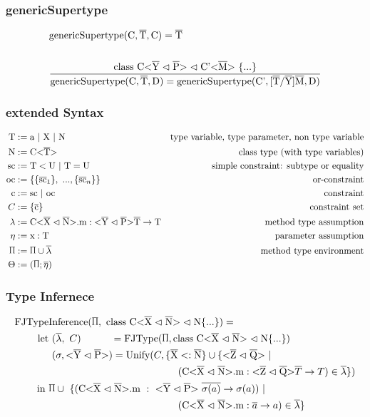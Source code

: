 \documentclass[aspectratio=169]{beamer}
\begin{document}
\begin{frame}[fragile]
    \frametitle{genericSupertype}
    \begin{align*}
        &\text{genericSupertype} (\text{C}, \overline{\text{T}}, \text{C} ) = \overline{\text{T}}\\
        \\
        &\frac{ \text{class} \ \text{C} \text{<} \overline{\text{Y}} \vartriangleleft \overline{\text{P}} \text{>} \vartriangleleft \text{C'<}\overline{\text{M}}\text{>} \ \{ ... \} }{ \text{genericSupertype} ( \text{C}, \overline{\text{T}}, \text{D} ) = \text{genericSupertype} ( \text{C'}, \text{[}\overline{\text{T}}/\overline{\text{Y}}\text{]}\overline{\text{M}}, \text{D} ) }\\
    \end{align*}
\end{frame}

\begin{frame}[fragile]
    \frametitle{extended Syntax}
    \begin{align*}
        \text{T} &:= \text{a} \ | \ \text{X} \ | \ \text{N} &\text{type variable, type parameter, non type variable} \\
        \text{N} &:= \text{C} \vv{\ot{T}} &\text{class type (with type variables)}\\
        \text{sc} &:= \text{T} < \text{U} \ | \ \text{T} = \text{U} &\text{simple constraint: subtype or equality}\\
        \text{oc} &:= \{ \{ \ot{sc}_1 \}, \ ..., \{ \ot{sc}_n \} \} &\text{or-constraint}\\
        \text{c} &:= \text{sc} \ | \ \text{oc} &\text{constraint}\\
        C &:= \{ \ot{c} \} &\text{constraint set}\\
        \lambda &:= \cm : \yp \oto{\text{T}} &\text{method type assumption}\\
        \eta &:= \text{x} : \text{T} &\text{parameter assumption}\\
        \sprod{0.7} &:= \sprod{0.7} \cup \overline{\lambda} &\text{method type environment}\\
        \Theta &:= ( \sprod{0.7}; \overline{\eta} )
    \end{align*}
\end{frame}

\begin{frame}[fragile]
    \frametitle{Type Infernece}
    \begin{align*}
        \text{FJType}&\text{Inference}(\sprod{0.7}, \ \classheader \{ ... \}) = \\
        \text{let} & \ (\overline{\lambda}, \ C) \quad \quad \quad = \text{FJType}(\sprod{0.7}, \classheader \{ ... \}) \\
        & \ (\sigma, \yp) = \text{Unify}(C, \{ \overline{\text{X}} <: \overline{\text{N}} \} \cup \{ \zq \ | \\
        & \quad \quad \quad \quad \quad \quad \quad \quad \quad \quad \quad \quad \quad (\cm : \zq \oto{T} ) \in \overline{\lambda} \} ) \\
        \text{in} \ & \sprod{0.7} \cup \ \{( \cm \ : \ \yp \ \oto{\sigma(a)}) \ | \\
        & \quad \quad \quad \quad \quad \quad \quad \quad \quad \quad \quad \quad \quad (\cm : \oto{a} ) \in \overline{\lambda} \}
    \end{align*}
\end{frame}
\end{document}

